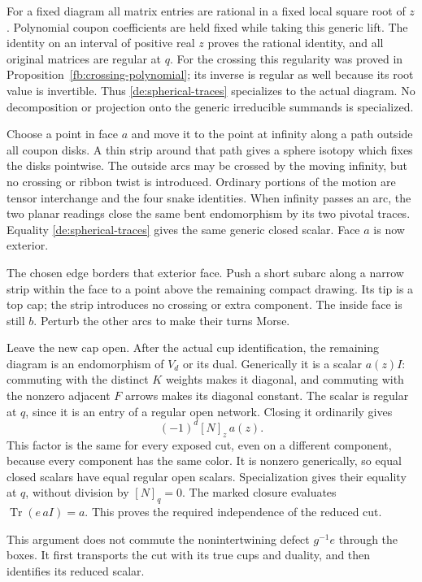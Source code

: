 For a fixed diagram all matrix entries are rational in a fixed
local square root of \(z\). Polynomial coupon coefficients are
held fixed while taking this generic lift. The identity on an
interval of positive real \(z\) proves the rational identity,
and all original matrices are regular at \(q\). For the
crossing this regularity was proved in
Proposition~\ref{fb:crossing-polynomial}; its inverse is regular
as well because its root value is invertible. Thus
\eqref{de:spherical-traces} specializes to the actual diagram.
No decomposition or projection onto the generic irreducible
summands is specialized.

Choose a point in face \(a\) and move it to the point at infinity
along a path outside all coupon disks. A thin strip around that
path gives a sphere isotopy which fixes the disks pointwise.
The outside arcs may be crossed by the moving infinity, but no
crossing or ribbon twist is introduced. Ordinary portions of the
motion are tensor interchange and the four snake identities.
When infinity passes an arc, the two planar readings close the
same bent endomorphism by its two pivotal traces. Equality
\eqref{de:spherical-traces} gives the same generic closed scalar.
Face \(a\) is now exterior.

The chosen edge borders that exterior face. Push a short subarc
along a narrow strip within the face to a point above the
remaining compact drawing. Its tip is a top cap; the strip
introduces no crossing or extra component. The inside face is
still \(b\). Perturb the other arcs to make their turns Morse.

Leave the new cap open. After the actual cup identification,
the remaining diagram is an endomorphism of \(V_d\) or its dual.
Generically it is a scalar \(a(z)I\): commuting with the distinct
\(K\) weights makes it diagonal, and commuting with the nonzero
adjacent \(F\) arrows makes its diagonal constant. The scalar is
regular at \(q\), since it is an entry of a regular open network.
Closing it ordinarily gives
\[
                         (-1)^d[N]_z\,a(z).
\]
This factor is the same for every exposed cut, even on a
different component, because every component has the same
color. It is nonzero generically, so equal closed scalars have
equal regular open scalars. Specialization gives their equality
at \(q\), without division by \([N]_q=0\).
The marked closure evaluates \(\operatorname{Tr}(e\,aI)=a\).
This proves the required independence of the reduced cut.

This argument does not commute the nonintertwining defect
\(g^{-1}e\) through the boxes. It first transports the cut with
its true cups and duality, and then identifies its reduced scalar.

